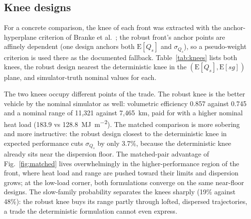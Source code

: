 \subsection{Knee designs}
\label{sec:knees}

For a concrete comparison, the knee of each front was extracted with the
anchor-hyperplane criterion of Branke et al.\ \cite{branke2004knees}; the
robust front's anchor points are affinely dependent (one design anchors
both $\mathrm{E}[Q_s]$ and $\sigma_{Q_s}$), so a pseudo-weight criterion is
used there as the documented fallback. Table~\ref{tab:knees} lists both
knees, the robust design nearest the deterministic knee in the
$(\mathrm{E}[Q_s],\mathrm{E}[sg])$ plane, and simulator-truth nominal
values for each.

The two knees occupy different points of the trade. The robust knee is the
better vehicle by the nominal simulator as well: volumetric efficiency
0.857 against 0.745 and a nominal range of 11{,}321 against 7{,}465~km,
paid for with a higher nominal heat load (183.9 vs
\SI{128.8}{\mega\joule\per\square\metre}). The matched comparison is more
sobering and more instructive: the robust design closest to the
deterministic knee in expected performance cuts $\sigma_{Q_s}$ by only
3.7\%, because the deterministic knee already sits near the dispersion
floor. The matched-pair advantage of Fig.~\ref{fig:matched} lives
overwhelmingly in the higher-performance region of the front, where heat
load and range are pushed toward their limits and dispersion grows; at the
low-load corner, both formulations converge on the same near-floor designs.
The slow-family probability separates the knees sharply (19\% against 48\%):
the robust knee buys its range partly through lofted, dispersed
trajectories, a trade the deterministic formulation cannot even express.

